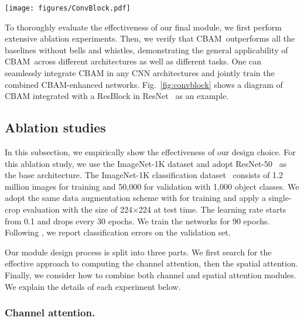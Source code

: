 \documentclass[runningheads]{llncs}
\newcommand{\figref}[1]{Fig.~\ref{#1}}
\newcommand*{\modulenameabb}{CBAM}
\begin{document}
\begin{figure*}[t]
  \centering
  \texttt{[image: figures/ConvBlock.pdf]}
  \caption{\textbf{CBAM integrated with a ResBlock in ResNet\cite{he2016deep}.} This figure shows the exact position of our module when integrated within a ResBlock. We apply CBAM on the convolution outputs in each block.}
  \label{fig:convblock}
  \vspace{-6mm}
\end{figure*}

To thoroughly evaluate the effectiveness of our final module, we first perform extensive ablation experiments. Then, we verify that \modulenameabb\ outperforms all the baselines without bells and whistles, demonstrating the general applicability of \modulenameabb\ across different architectures as well as different tasks. One can seamlessly integrate CBAM in any CNN architectures and jointly train the combined CBAM-enhanced networks. \figref{fig:convblock} shows a diagram of CBAM integrated with a ResBlock in ResNet~\cite{he2016deep} as an example.


\subsection{Ablation studies}
\label{sec:ablation}
In this subsection, we empirically show the effectiveness of our design choice. For this ablation study, we use the ImageNet-1K dataset and adopt ResNet-50~\cite{he2016deep} as the base architecture. The ImageNet-1K classification dataset~\cite{deng2009imagenet} consists of 1.2 million images for training and 50,000 for validation with 1,000 object classes. We adopt the same data augmentation scheme with \cite{he2016deep,he2016identity} for training and apply a single-crop evaluation with the size of 224$\times$224 at test time. The learning rate starts from 0.1 and drops every 30 epochs. We train the networks for 90 epochs. Following \cite{he2016deep,he2016identity,huang2016deep}, we report classification errors on the validation set.

Our module design process is split into three parts. We first search for the effective approach to computing the channel attention, then the spatial attention. Finally, we consider how to combine both channel and spatial attention modules. We explain the details of each experiment below.

\subsubsection{Channel attention.}\label{sec:channel_ablation}
\end{document}
